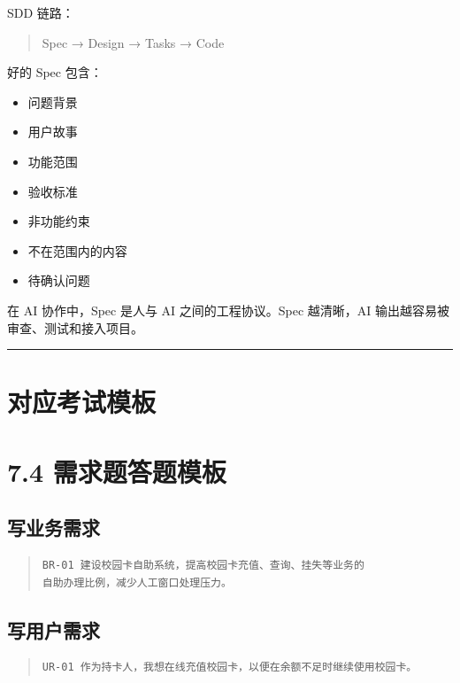 \documentclass[UTF8,zihao=-4]{ctexart}
\begin{document}
SDD 链路：

\begin{quote}
Spec → Design → Tasks → Code
\end{quote}

好的 Spec 包含：

\begin{itemize}
\item 问题背景
\item 用户故事
\item 功能范围
\item 验收标准
\item 非功能约束
\item 不在范围内的内容
\item 待确认问题
\end{itemize}

在 AI 协作中，Spec 是人与 AI 之间的工程协议。Spec 越清晰，AI 输出越容易被审查、测试和接入项目。

\bigskip\hrule\bigskip

\section{对应考试模板}

\section{7.4 需求题答题模板}

\subsection{写业务需求}

\begin{quote}
\footnotesize
\begin{verbatim}
BR-01 建设校园卡自助系统，提高校园卡充值、查询、挂失等业务的
自助办理比例，减少人工窗口处理压力。
\end{verbatim}
\end{quote}

\subsection{写用户需求}

\begin{quote}
\footnotesize
\begin{verbatim}
UR-01 作为持卡人，我想在线充值校园卡，以便在余额不足时继续使用校园卡。
\end{verbatim}
\end{quote}
\end{document}
